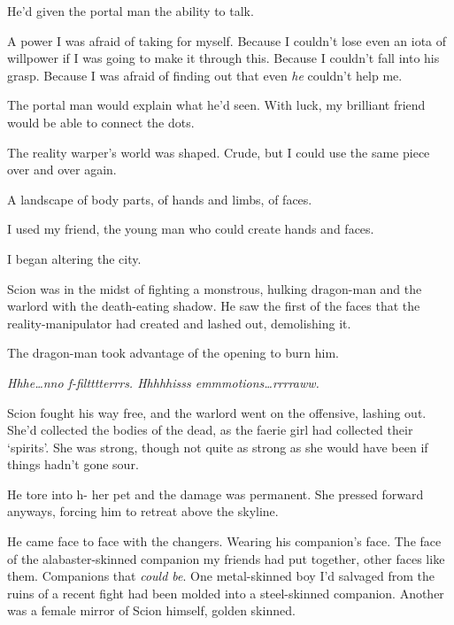 He'd given the portal man the ability to talk.



A power I was afraid of taking for myself.  Because I couldn't lose even an iota of willpower if I was going to make it through this.  Because I couldn't fall into his grasp.  Because I was afraid of finding out that even \emph{he} couldn't help me.



The portal man would explain what he'd seen.  With luck, my brilliant friend would be able to connect the dots.



The reality warper's world was shaped.  Crude, but I could use the same piece over and over again.



A landscape of body parts, of hands and limbs, of faces.



I used my friend, the young man who could create hands and faces.



I began altering the city.



Scion was in the midst of fighting a monstrous, hulking dragon-man and the warlord with the death-eating shadow.  He saw the first of the faces that the reality-manipulator had created and lashed out, demolishing it.



The dragon-man took advantage of the opening to burn him.



\emph{Hhhe\ldots nno f-filtttterrrs.  Hhhhhisss emmmotions\ldots rrrraww.}



Scion fought his way free, and the warlord went on the offensive, lashing out.  She'd collected the bodies of the dead, as the faerie girl had collected their `spirits'.  She was strong, though not quite as strong as she would have been if things hadn't gone sour.



He tore into h- her pet and the damage was permanent.  She pressed forward anyways, forcing him to retreat above the skyline.



He came face to face with the changers.  Wearing his companion's face.  The face of the alabaster-skinned companion my friends had put together, other faces like them.  Companions that \emph{could be}.  One metal-skinned boy I'd salvaged from the ruins of a recent fight had been molded into a steel-skinned companion.  Another was a female mirror of Scion himself, golden skinned.



